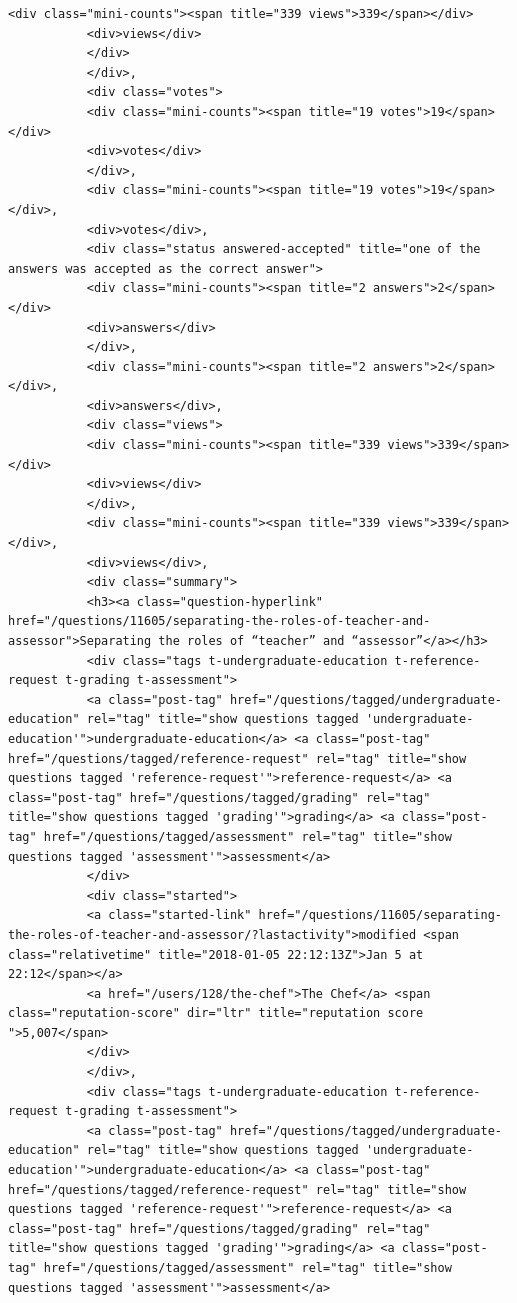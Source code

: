\documentclass[11pt]{article}
\begin{document}
\begin{Verbatim}[commandchars=\\\{\}]
           <div class="mini-counts"><span title="339 views">339</span></div>
           <div>views</div>
           </div>
           </div>,
           <div class="votes">
           <div class="mini-counts"><span title="19 votes">19</span></div>
           <div>votes</div>
           </div>,
           <div class="mini-counts"><span title="19 votes">19</span></div>,
           <div>votes</div>,
           <div class="status answered-accepted" title="one of the answers was accepted as the correct answer">
           <div class="mini-counts"><span title="2 answers">2</span></div>
           <div>answers</div>
           </div>,
           <div class="mini-counts"><span title="2 answers">2</span></div>,
           <div>answers</div>,
           <div class="views">
           <div class="mini-counts"><span title="339 views">339</span></div>
           <div>views</div>
           </div>,
           <div class="mini-counts"><span title="339 views">339</span></div>,
           <div>views</div>,
           <div class="summary">
           <h3><a class="question-hyperlink" href="/questions/11605/separating-the-roles-of-teacher-and-assessor">Separating the roles of “teacher” and “assessor”</a></h3>
           <div class="tags t-undergraduate-education t-reference-request t-grading t-assessment">
           <a class="post-tag" href="/questions/tagged/undergraduate-education" rel="tag" title="show questions tagged 'undergraduate-education'">undergraduate-education</a> <a class="post-tag" href="/questions/tagged/reference-request" rel="tag" title="show questions tagged 'reference-request'">reference-request</a> <a class="post-tag" href="/questions/tagged/grading" rel="tag" title="show questions tagged 'grading'">grading</a> <a class="post-tag" href="/questions/tagged/assessment" rel="tag" title="show questions tagged 'assessment'">assessment</a>
           </div>
           <div class="started">
           <a class="started-link" href="/questions/11605/separating-the-roles-of-teacher-and-assessor/?lastactivity">modified <span class="relativetime" title="2018-01-05 22:12:13Z">Jan 5 at 22:12</span></a>
           <a href="/users/128/the-chef">The Chef</a> <span class="reputation-score" dir="ltr" title="reputation score ">5,007</span>
           </div>
           </div>,
           <div class="tags t-undergraduate-education t-reference-request t-grading t-assessment">
           <a class="post-tag" href="/questions/tagged/undergraduate-education" rel="tag" title="show questions tagged 'undergraduate-education'">undergraduate-education</a> <a class="post-tag" href="/questions/tagged/reference-request" rel="tag" title="show questions tagged 'reference-request'">reference-request</a> <a class="post-tag" href="/questions/tagged/grading" rel="tag" title="show questions tagged 'grading'">grading</a> <a class="post-tag" href="/questions/tagged/assessment" rel="tag" title="show questions tagged 'assessment'">assessment</a>

\end{Verbatim}
\end{document}
